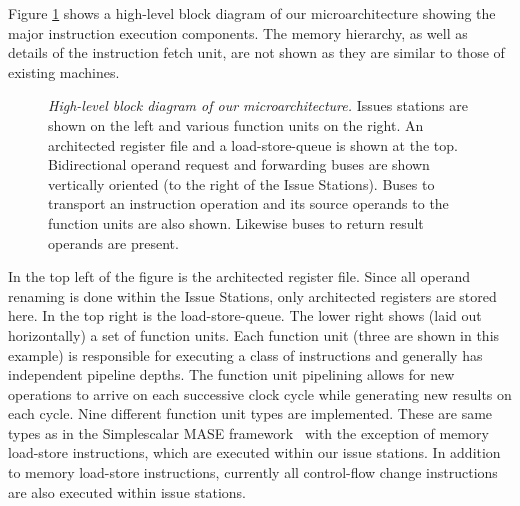 \documentclass[10pt,dvips]{article}
\begin{document}
Figure \ref{fig:overview} shows a high-level block diagram
of our microarchitecture showing the major instruction execution components.
The memory hierarchy, as well as details of the instruction fetch
unit, are not shown as they are similar to those of existing
machines.
%
\begin{figure}
\centering
\scriptsize {
}
\caption{{\em High-level block diagram of our microarchitecture.} 
Issues stations are shown on the left and various function
units on the right.  An architected register file and a
load-store-queue is shown at the top.
Bidirectional operand request and forwarding buses are shown
vertically oriented (to the right of the Issue Stations).
Buses to transport an instruction operation and its source operands
to the function units are also shown. 
Likewise buses to return result operands are present.}
\label{fig:overview}
\end{figure}
%
In the top left of the figure is the architected register file.
Since all operand renaming is done within the Issue Stations,
only architected registers are stored here.
In the top right is the load-store-queue.
The lower right shows (laid out horizontally) a set of function units.
Each function unit (three are shown in this example)
is responsible for executing a class of
instructions and generally has independent pipeline depths.
The function unit pipelining allows for new operations to arrive
on each successive clock cycle while generating new results on
each cycle.
Nine different function unit types are implemented.
These are same types as in
the Simplescalar MASE framework~\cite{Austin97} with the
exception of memory load-store instructions, which are executed within our
issue stations.
In addition to memory load-store instructions, currently
all control-flow change instructions are also executed within
issue stations.
\end{document}
